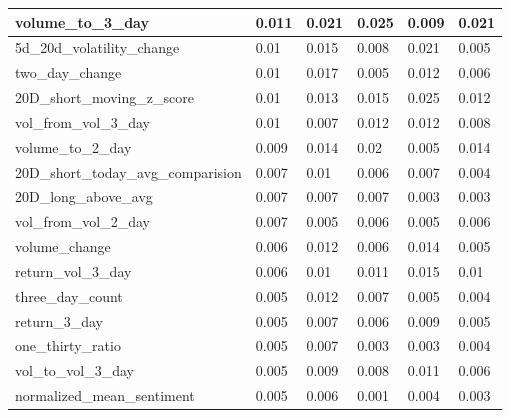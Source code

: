 \documentclass[letterpaper]{article}
\begin{document}
\begin{table}[H]
\begin{tabular}{|l|l|l|l|l|l|}
    volume\_to\_3\_day                  & 0.011        & 0.021        & 0.025        & 0.009        & 0.021        \\ \hline
    5d\_20d\_volatility\_change         & 0.01         & 0.015        & 0.008        & 0.021        & 0.005        \\ \hline
    two\_day\_change                    & 0.01         & 0.017        & 0.005        & 0.012        & 0.006        \\ \hline
    20D\_short\_moving\_z\_score        & 0.01         & 0.013        & 0.015        & 0.025        & 0.012        \\ \hline
    vol\_from\_vol\_3\_day              & 0.01         & 0.007        & 0.012        & 0.012        & 0.008        \\ \hline
    volume\_to\_2\_day                  & 0.009        & 0.014        & 0.02         & 0.005        & 0.014        \\ \hline
    20D\_short\_today\_avg\_comparision & 0.007        & 0.01         & 0.006        & 0.007        & 0.004        \\ \hline
    20D\_long\_above\_avg               & 0.007        & 0.007        & 0.007        & 0.003        & 0.003        \\ \hline
    vol\_from\_vol\_2\_day              & 0.007        & 0.005        & 0.006        & 0.005        & 0.006        \\ \hline
    volume\_change                      & 0.006        & 0.012        & 0.006        & 0.014        & 0.005        \\ \hline
    return\_vol\_3\_day                 & 0.006        & 0.01         & 0.011        & 0.015        & 0.01         \\ \hline
    three\_day\_count                   & 0.005        & 0.012        & 0.007        & 0.005        & 0.004        \\ \hline
    return\_3\_day                      & 0.005        & 0.007        & 0.006        & 0.009        & 0.005        \\ \hline
    one\_thirty\_ratio                  & 0.005        & 0.007        & 0.003        & 0.003        & 0.004        \\ \hline
    vol\_to\_vol\_3\_day                & 0.005        & 0.009        & 0.008        & 0.011        & 0.006        \\ \hline
    normalized\_mean\_sentiment         & 0.005        & 0.006        & 0.001        & 0.004        & 0.003        \\ \hline

\end{tabular}
\end{table}
\end{document}
